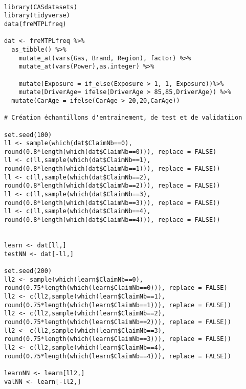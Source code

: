 \documentclass[11pt,letterpaper]{article}
\begin{document}
\begin{lstlisting}

library(CASdatasets)
library(tidyverse)
data(freMTPLfreq)

dat <- freMTPLfreq %>%
  as_tibble() %>%
    mutate_at(vars(Gas, Brand, Region), factor) %>%
    mutate_at(vars(Power),as.integer) %>% 

    mutate(Exposure = if_else(Exposure > 1, 1, Exposure))%>% 
    mutate(DriverAge= ifelse(DriverAge > 85,85,DriverAge)) %>% 
  mutate(CarAge = ifelse(CarAge > 20,20,CarAge))

# Création échantillons d'entrainement, de test et de validatiion

set.seed(100)
ll <- sample(which(dat$ClaimNb==0), round(0.8*length(which(dat$ClaimNb==0))), replace = FALSE)
ll <- c(ll,sample(which(dat$ClaimNb==1), round(0.8*length(which(dat$ClaimNb==1))), replace = FALSE))
ll <- c(ll,sample(which(dat$ClaimNb==2), round(0.8*length(which(dat$ClaimNb==2))), replace = FALSE))
ll <- c(ll,sample(which(dat$ClaimNb==3), round(0.8*length(which(dat$ClaimNb==3))), replace = FALSE))
ll <- c(ll,sample(which(dat$ClaimNb==4), round(0.8*length(which(dat$ClaimNb==4))), replace = FALSE))


learn <- dat[ll,]
testNN <- dat[-ll,]

set.seed(200)
ll2 <- sample(which(learn$ClaimNb==0), round(0.75*length(which(learn$ClaimNb==0))), replace = FALSE)
ll2 <- c(ll2,sample(which(learn$ClaimNb==1), round(0.75*length(which(learn$ClaimNb==1))), replace = FALSE))
ll2 <- c(ll2,sample(which(learn$ClaimNb==2), round(0.75*length(which(learn$ClaimNb==2))), replace = FALSE))
ll2 <- c(ll2,sample(which(learn$ClaimNb==3), round(0.75*length(which(learn$ClaimNb==3))), replace = FALSE))
ll2 <- c(ll2,sample(which(learn$ClaimNb==4), round(0.75*length(which(learn$ClaimNb==4))), replace = FALSE))

learnNN <- learn[ll2,]
valNN <- learn[-ll2,]

\end{lstlisting}
\end{document}
